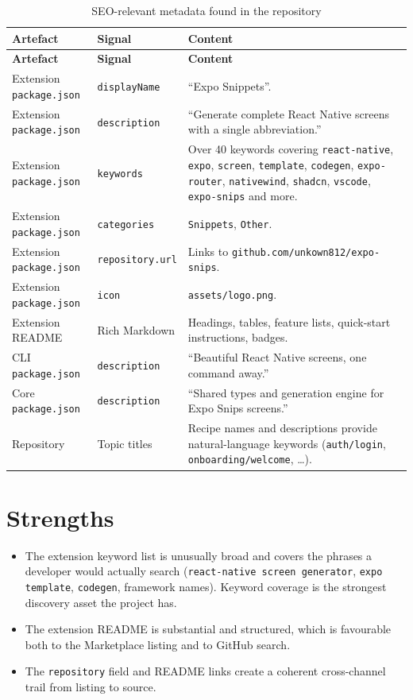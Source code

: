 \begin{longtable}{@{}L{3.6cm}L{3.2cm}L{7.4cm}@{}}
\caption{SEO-relevant metadata found in the repository}\\
\toprule
\textbf{Artefact} & \textbf{Signal} & \textbf{Content} \\
\midrule
\endfirsthead
\toprule
\textbf{Artefact} & \textbf{Signal} & \textbf{Content} \\
\midrule
\endhead
Extension \texttt{package.json} & \texttt{displayName} & ``Expo Snippets''. \\
Extension \texttt{package.json} & \texttt{description} & ``Generate complete React
Native screens with a single abbreviation.'' \\
Extension \texttt{package.json} & \texttt{keywords} & Over 40 keywords covering
\texttt{react-native}, \texttt{expo}, \texttt{screen}, \texttt{template},
\texttt{codegen}, \texttt{expo-router}, \texttt{nativewind}, \texttt{shadcn},
\texttt{vscode}, \texttt{expo-snips} and more. \\
Extension \texttt{package.json} & \texttt{categories} & \texttt{Snippets},
\texttt{Other}. \\
Extension \texttt{package.json} & \texttt{repository.url} & Links to
\texttt{github.com/unkown812/expo-snips}. \\
Extension \texttt{package.json} & \texttt{icon} & \texttt{assets/logo.png}. \\
Extension README & Rich Markdown & Headings, tables, feature lists, quick-start
instructions, badges. \\
CLI \texttt{package.json} & \texttt{description} & ``Beautiful React Native
screens, one command away.'' \\
Core \texttt{package.json} & \texttt{description} & ``Shared types and generation
engine for Expo Snips screens.'' \\
Repository & Topic titles & Recipe names and descriptions provide natural-language
keywords (\texttt{auth/login}, \texttt{onboarding/welcome}, \dots). \\
\bottomrule
\end{longtable}

\section{Strengths}

\begin{itemize}
  \item The extension keyword list is unusually broad and covers the phrases a
        developer would actually search (\texttt{react-native screen generator},
        \texttt{expo template}, \texttt{codegen}, framework names). Keyword
        coverage is the strongest discovery asset the project has.
  \item The extension README is substantial and structured, which is favourable
        both to the Marketplace listing and to GitHub search.
  \item The \texttt{repository} field and README links create a coherent
        cross-channel trail from listing to source.
\end{itemize}

